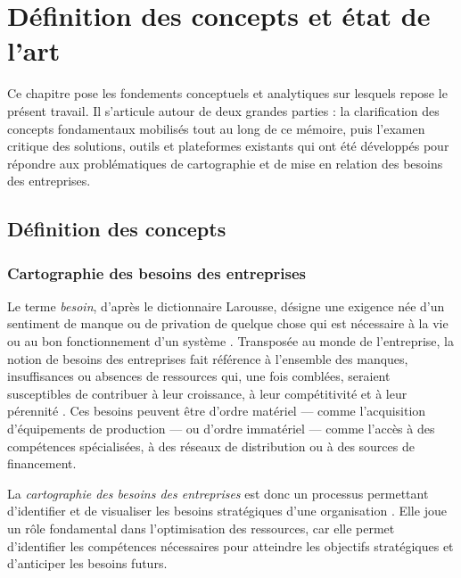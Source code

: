 \documentclass[12pt, a4paper, oneside]{report}
\begin{document}
\chapter{Définition des concepts et état de l'art}
\label{chap:etat_art}

Ce chapitre pose les fondements conceptuels et analytiques sur lesquels repose le présent travail. Il s'articule autour de deux grandes parties : la clarification des concepts fondamentaux mobilisés tout au long de ce mémoire, puis l'examen critique des solutions, outils et plateformes existants qui ont été développés pour répondre aux problématiques de cartographie et de mise en relation des besoins des entreprises.

\section{Définition des concepts}
\label{sec:concepts}

\subsection{Cartographie des besoins des entreprises}

Le terme \textit{besoin}, d'après le dictionnaire Larousse, désigne une exigence née d'un sentiment de manque ou de privation de quelque chose qui est nécessaire à la vie ou au bon fonctionnement d'un système \cite{larousse}. Transposée au monde de l'entreprise, la notion de besoins des entreprises fait référence à l'ensemble des manques, insuffisances ou absences de ressources qui, une fois comblées, seraient susceptibles de contribuer à leur croissance, à leur compétitivité et à leur pérennité \cite{ocde2021}. Ces besoins peuvent être d'ordre matériel --- comme l'acquisition d'équipements de production --- ou d'ordre immatériel --- comme l'accès à des compétences spécialisées, à des réseaux de distribution ou à des sources de financement.

La \textit{cartographie des besoins des entreprises} est donc un processus permettant d'identifier et de visualiser les besoins stratégiques d'une organisation \cite{oserentreprendre}. Elle joue un rôle fondamental dans l'optimisation des ressources, car elle permet d'identifier les compétences nécessaires pour atteindre les objectifs stratégiques et d'anticiper les besoins futurs.
\end{document}
